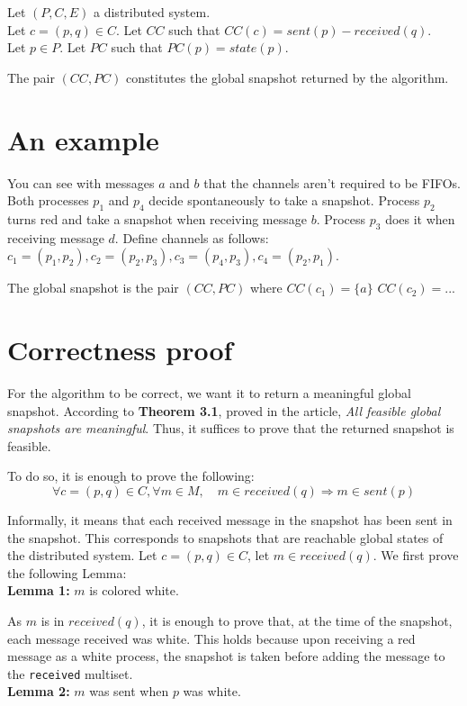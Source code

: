 \documentclass{article}
\begin{document}
Let $(P,C,E)$ a distributed system.\\
Let $c=(p,q)\in C$. Let $CC$ such that $CC(c) = \mathit{sent}(p) - \mathit{received}(q)$.\\
Let $p\in P$. Let $PC$ such that $PC(p)=\mathit{state}(p)$.

The pair $(CC,PC)$ constitutes the global snapshot returned by the algorithm.

\section{An example}

You can see with messages $a$ and $b$ that the channels aren't required to be FIFOs.
Both processes $p_1$ and $p_4$ decide spontaneously to take a snapshot.
Process $p_2$ turns red and take a snapshot when receiving message $b$.
Process $p_3$ does it when receiving message $d$.
Define channels as follows:
$c_1=(p_1,p_2), c_2=(p_2,p_3), c_3=(p_4,p_3), c_4=(p_2,p_1)$.

The global snapshot is the pair $(CC,PC)$ where
$CC(c_1)=\{a\}$
$CC(c_2)=$...



\section{Correctness proof}

For the algorithm to be correct, we want it to return a meaningful global snapshot.
According to \textbf{Theorem 3.1}, proved in the article, \textit{All feasible global snapshots are meaningful}.
Thus, it suffices to prove that the returned snapshot is feasible.

To do so, it is enough to prove the following:
$$\forall c=(p,q)\in C, \forall m\in M,\quad m\in\mathit{received}(q)\Rightarrow m\in\mathit{sent}(p)$$

Informally, it means that each received message in the snapshot has been sent in the snapshot. This corresponds to snapshots that are reachable global states of the distributed system.
Let $c=(p,q)\in C$, let $m\in\mathit{received}(q)$.
We first prove the following Lemma:\\
\textbf{Lemma 1:} $m$ is colored white.

As $m$ is in $\mathit{received}(q)$, it is enough to prove that, at the time of the snapshot, each message received was white. This holds because upon receiving a red message as a white process, the snapshot is taken before adding the message to the \lstinline{received} multiset.\\
\textbf{Lemma 2:} $m$ was sent when $p$ was white.
\end{document}
